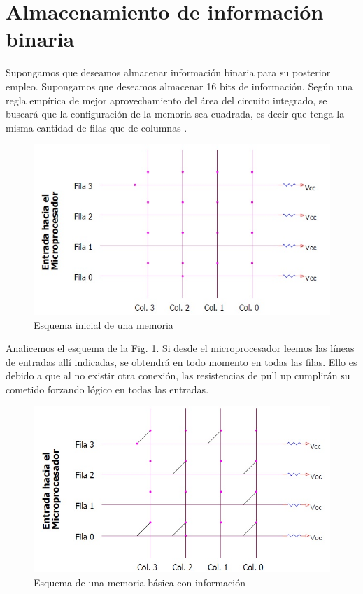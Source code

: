 \documentclass[12pt]{book}
\theoremstyle{definition}
\theoremstyle{remark}
\theoremstyle{plain}
\begin{document}
\section{Almacenamiento de información binaria}

Supongamos que deseamos almacenar información binaria para su posterior empleo. Supongamos que deseamos almacenar 16 bits de información. Según una regla empírica de mejor aprovechamiento del área del circuito integrado, se buscará que la configuración de la memoria sea cuadrada, es decir que tenga la misma cantidad de filas que de columnas .


\begin{figure}
\centering
\includegraphics[width=5in]{entrada.jpg}
\caption{Esquema inicial de una memoria}
\label{fig7}
\end{figure}

Analicemos el esquema de la Fig. \ref{fig7}. Si desde el microprocesador leemos las líneas de entradas allí indicadas, se obtendrá en todo momento  \grqq en todas las filas. Ello es debido a que al no existir otra conexión, las resistencias de pull up cumplirán su cometido forzando  \grqq lógico en todas las entradas.

\begin{figure}
\centering
\includegraphics[width=5in]{entrada2.jpg}
\caption{Esquema de una memoria básica con información}
\label{fig8}
\end{figure}
\end{document}
